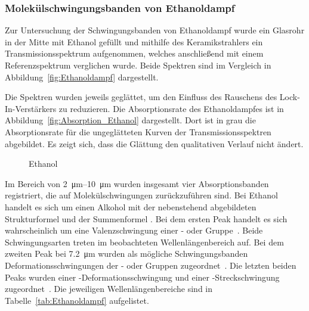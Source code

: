 \documentclass[a4paper,twoside,final]{article}
\begin{document}
\subsubsection{Molekülschwingungsbanden von Ethanoldampf}
Zur Untersuchung der Schwingungsbanden von Ethanoldampf wurde ein Glasrohr in der Mitte mit Ethanol gefüllt und mithilfe des Keramikstrahlers ein Transmissionsspektrum aufgenommen, welches anschließend mit einem Referenzspektrum verglichen wurde. Beide Spektren sind im Vergleich in Abbildung~\ref{fig:Ethanoldampf} dargestellt.



Die Spektren wurden jeweils geglättet, um den Einfluss des Rauschens des Lock-In-Verstärkers zu reduzieren. Die Absorptionsrate des Ethanoldampfes ist in Abbildung~\ref{fig:Absorption_Ethanol} dargestellt. Dort ist in grau die Absorptionsrate für die ungeglätteten Kurven der Transmissionsspektren abgebildet. Es zeigt sich, dass die Glättung den qualitativen Verlauf nicht ändert.



\begin{figure}
  \centering
  \caption{Ethanol}
\end{figure}
Im Bereich von \SIrange{2}{10}{\micro\metre} wurden insgesamt vier Absorptionsbanden registriert, die auf Molekülschwingungen zurückzuführen sind. Bei Ethanol handelt es sich um einen Alkohol mit der nebenstehend abgebildeten Strukturformel und der Summenformel . Bei dem ersten Peak handelt es sich wahrscheinlich um eine Valenzschwingung einer - oder  Gruppe~\cite{Roempp}. Beide Schwingungsarten treten im beobachteten Wellenlängenbereich auf. Bei dem zweiten Peak bei \SI{7.2}{\micro\metre} wurden als mögliche Schwingungsbanden Deformationsschwingungen der - oder  Gruppen zugeordnet~\cite{Roempp}. Die letzten beiden Peaks wurden einer -Deformationsschwingung und einer -Streckschwingung zugeordnet~\cite{Gunzler}. Die jeweiligen Wellenlängenbereiche sind in Tabelle~\ref{tab:Ethanoldampf} aufgelistet.
\end{document}
